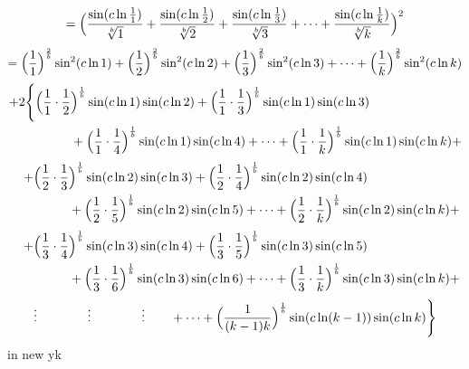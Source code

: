 \documentclass{amsart}
\begin{document}
	\[ = \Bigl( \frac{\sin({c\ln \frac{1}{1}})}{\sqrt[b]{1}} + \frac{\sin({c\ln \frac{1}{2}})}{\sqrt[b]{2}} + \frac{\sin({c\ln \frac{1}{3}})}{\sqrt[b]{3}} + \dots + \frac{\sin({c\ln \frac{1}{k}})}{\sqrt[b]{k}} \Bigr)^2 \]
	\[ = \Bigl( \frac{1}{1} \Bigr)^{\frac2b}\sin^2({c \ln 1}) + \Bigl( \frac{1}{2} \Bigr)^{\frac2b}\sin^2({c \ln 2}) + \Bigl( \frac{1}{3} \Bigr)^{\frac2b}\sin^2({c \ln 3}) + \dots + \Bigl( \frac{1}{k} \Bigr)^{\frac2b}\sin^2({c \ln k}) \]
	\[
	\begin{aligned}
		+2\Biggl\{ \Bigl( \frac{1}{1} \cdot \frac{1}{2}& \Bigr)^\frac1b \sin(c \ln1) \sin(c \ln2) + \Bigl( \frac{1}{1} \cdot \frac{1}{3} \Bigr)^\frac1b \sin(c \ln 1) \sin(c \ln 3) \\ 
		& + \Bigl( \frac{1}{1} \cdot \frac{1}{4} \Bigr)^\frac1b \sin(c \ln 1) \sin(c \ln 4) + \dots + \Bigl( \frac{1}{1} \cdot \frac{1}{k} \Bigr)^\frac1b \sin(c \ln 1) \sin(c \ln k) + \\ 		
	\end{aligned}
	\]
	\[
	\begin{aligned}
		\quad + \Bigl( \frac{1}{2} \cdot \frac{1}{3}& \Bigr)^\frac1b \sin(c \ln2) \sin(c \ln3) + \Bigl( \frac{1}{2} \cdot \frac{1}{4} \Bigr)^\frac1b \sin(c \ln 2) \sin(c \ln 4) \\ 
		& + \Bigl( \frac{1}{2} \cdot \frac{1}{5} \Bigr)^\frac1b \sin(c \ln 2) \sin(c \ln 5) + \dots + \Bigl( \frac{1}{2} \cdot \frac{1}{k} \Bigr)^\frac1b \sin(c \ln 2) \sin(c \ln k) + \\ 		
	\end{aligned}
	\]
	\[
	\begin{aligned}
		\quad + \Bigl( \frac{1}{3} \cdot \frac{1}{4}& \Bigr)^\frac1b \sin(c \ln3) \sin(c \ln4) + \Bigl( \frac{1}{3} \cdot \frac{1}{5} \Bigr)^\frac1b \sin(c \ln 3) \sin(c \ln 5) \\ 
		& + \Bigl( \frac{1}{3} \cdot \frac{1}{6} \Bigr)^\frac1b \sin(c \ln 3) \sin(c \ln 6) + \dots + \Bigl( \frac{1}{3} \cdot \frac{1}{k} \Bigr)^\frac1b \sin(c \ln 3) \sin(c \ln k) + \\ 		
	\end{aligned}
	\]
	\[
	\begin{aligned}
		\vdots \qquad\qquad \vdots \qquad\qquad \vdots \qquad + \dots + \Bigl( \frac{1}{(k-1)k} \Bigr)^\frac1b \sin(c \ln (k-1)) \sin(c \ln k) \Biggr\}
	\end{aligned}
	\]
	in new yk
	
\end{document}
